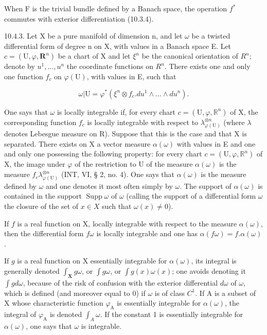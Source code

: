 When F is the trivial bundle defined by a Banach space, the operation \(f^*\) commutes with exterior differentiation (10.3.4).

10.4.3. Let X be a pure manifold of dimension n, and let \(\omega\) be a twisted differential form of degree n on X, with values in a Banach space E. Let \(c = (\mathrm{U}, \varphi, \mathbf{R}^{n})\) be a chart of X and let \(\xi^{n}\) be the canonical orientation of \(R^{n}\); denote by \(u^{1}, \ldots, u^{n}\) the coordinate functions on \(R^{n}\). There exists one and only one function \(f_{c}\) on \(\varphi(\mathrm{U})\), with values in E, such that

\[
\omega | \mathrm{U} = \varphi^ {*} (\xi^ {n} \otimes f _ {c}. d u ^ {1} \wedge \dots \wedge d u ^ {n}).
\]

One says that \(\omega\) is locally integrable if, for every chart \(c = (\mathrm{U},\varphi ,\mathbb{R}^n)\) of X, the corresponding function \(f_{c}\) is locally integrable with respect to \(\lambda_{\varphi (\mathrm{U})}^{\otimes n}\) (where \(\lambda\) denotes Lebesgue measure on R). Suppose that this is the case and that X is separated. There exists on X a vector measure \(\alpha (\omega)\) with values in E and one and only one possessing the following property: for every chart \(c = (\mathrm{U},\varphi ,\mathbb{R}^n)\) of X, the image under \(\varphi\) of the restriction to U of the measure \(\alpha (\omega)\) is the measure \(f_{c}\lambda_{\varphi(\mathrm{U})}^{\otimes n}\) (INT, VI, § 2, no. 4). One says that \(\alpha (\omega)\) is the measure defined by \(\omega\) and one denotes it most often simply by \(\omega\). The support of \(\alpha (\omega)\) is contained in the support \(\operatorname{Supp}\omega\) of \(\omega\) (calling the support of a differential form \(\omega\) the closure of the set of \(x\in X\) such that \(\omega (x)\neq 0\)).

If \(f\) is a real function on X, locally integrable with respect to the measure \(\alpha(\omega)\), then the differential form \(f\omega\) is locally integrable and one has \(\alpha(f\omega) = f.\alpha(\omega)\).

If \(g\) is a real function on X essentially integrable for \(\alpha(\omega)\), its integral is generally denoted \(\int_{\mathbf{X}} g\omega\), or \(\int g\omega\), or \(\int g(x)\omega(x)\); one avoids denoting it \(\int g d\omega\), because of the risk of confusion with the exterior differential \(d\omega\) of \(\omega\), which is defined (and moreover equal to 0) if \(\omega\) is of class \(C^{1}\). If A is a subset of X whose characteristic function \(\varphi_{\mathrm{A}}\) is essentially integrable for \(\alpha(\omega)\), the integral of \(\varphi_{\mathrm{A}}\) is denoted \(\int_{A} \omega\). If the constant 1 is essentially integrable for \(\alpha(\omega)\), one says that \(\omega\) is integrable.

